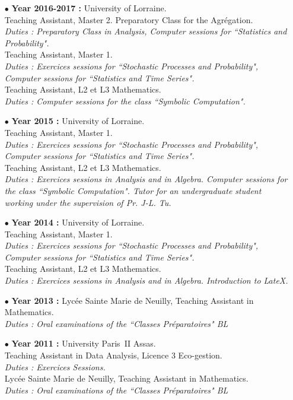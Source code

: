 \documentclass[a4paper,11pt]{article}
\begin{document}
\begin{itemize}
\item[$\bullet$] \textbf{ Year 2016-2017 :} University of Lorraine.\\
					Teaching Assistant, Master 2. Preparatory Class for the Agrégation.\\
					\textit{Duties : Preparatory Class in Analysis, Computer sessions for ``Statistics and Probability".}\\
					Teaching Assistant, Master 1.\\
					\textit{Duties : Exercices sessions for ``Stochastic Processes and Probability", Computer sessions for ``Statistics and Time Series".}\\
					Teaching Assistant, L2 et L3 Mathematics. \\
					\textit{Duties : Computer sessions for the class ``Symbolic Computation".}\\   
\item[$\bullet$] \textbf{ Year 2015 :} University of Lorraine.\\
					Teaching Assistant, Master 1.\\
					\textit{Duties : Exercices sessions for ``Stochastic Processes and Probability", Computer sessions for ``Statistics and Time Series".}\\
					Teaching Assistant, L2 et L3 Mathematics. \\
					\textit{Duties : Exercices sessions in Analysis and in Algebra. Computer sessions for the class ``Symbolic Computation". Tutor for an undergraduate student working under the supervision of Pr. J-L. Tu.}\\   
					
\item[$\bullet$] \textbf{ Year 2014 :}  University of Lorraine.\\
					Teaching Assistant, Master 1. \\
					\textit{Duties : Exercices sessions for ``Stochastic Processes and Probability", Computer sessions for ``Statistics and Time Series".}\\
					Teaching Assistant, L2 et L3 Mathematics. \\
					\textit{Duties : Exercices sessions in Analysis and in Algebra. Introduction to LateX.}\\
\item[$\bullet$] \textbf{ Year 2013 :} Lycée Sainte Marie de Neuilly, Teaching Assistant in Mathematics. \\
					\textit{Duties : Oral examinations of the ``Classes Préparatoires" BL} \\

\item[$\bullet$] \textbf{ Year 2011 :} University Paris~II Assas.\\
					Teaching Assistant in Data Analysis, Licence 3 Eco-gestion.\\
					\textit{Duties : Exercices Sessions.}\\
					Lycée Sainte Marie de Neuilly, Teaching Assistant in Mathematics. \\
					\textit{Duties : Oral examinations of the ``Classes Préparatoires" BL} 
\end{itemize}
\end{document}
